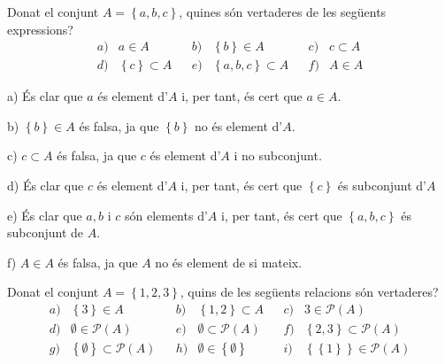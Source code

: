 \begin{exercici}
Donat el conjunt $A=\left\{ a,b,c\right\} $, quines s\'{o}n vertaderes de
les seg\"{u}ents expressions?%
\begin{equation*}
\begin{array}{cccccccc}
a) & a\in A &  & b) & \left\{ b\right\} \in A &  & c) & c\subset A \\
d) & \left\{ c\right\} \subset A &  & e) & \left\{ a,b,c\right\} \subset A &
& f) & A\in A%
\end{array}%
\end{equation*}
\end{exercici}

\begin{solucio}
a) \'{E}s clar que $a$ \'{e}s element d'$A$ i, per tant, \'{e}s cert que $%
a\in A$.

b) $\left\{ b\right\} \in A$ \'{e}s falsa, ja que $\left\{ b\right\} $ no
\'{e}s element d'$A$.

c) $c\subset A$ \'{e}s falsa, ja que $c$ \'{e}s element d'$A$ i no
subconjunt.

d) \'{E}s clar que $c$ \'{e}s element d'$A$ i, per tant, \'{e}s cert que $%
\left\{ c\right\} $ \'{e}s subconjunt d'$A$

e) \'{E}s clar que $a,b$ i $c$ s\'{o}n elements d'$A$ i, per tant, \'{e}s
cert que $\left\{ a,b,c\right\} $ \'{e}s subconjunt de $A$.

f) $A\in A$ \'{e}s falsa, ja que $A$ no \'{e}s element de si mateix.
\end{solucio}

\begin{exercici}
Donat el conjunt $A=\left\{ 1,2,3\right\} $, quins de les seg\"{u}ents
relacions s\'{o}n vertaderes?%
\begin{equation*}
\begin{array}{llllllll}
a) & \left\{ 3\right\} \in A &  & b) & \left\{ 1,2\right\} \subset A &  & c)
& 3\in \mathcal{P}(A) \\
d) & \emptyset \in \mathcal{P}(A) &  & e) & \emptyset \subset \mathcal{P}(A)
&  & f) & \left\{ 2,3\right\} \subset \mathcal{P}(A) \\
g) & \left\{ \emptyset \right\} \subset \mathcal{P}(A) &  & h) & \emptyset
\in \left\{ \emptyset \right\} &  & i) & \left\{ \left\{ 1\right\} \right\}
\in \mathcal{P}(A)%
\end{array}%
\end{equation*}
\end{exercici}

